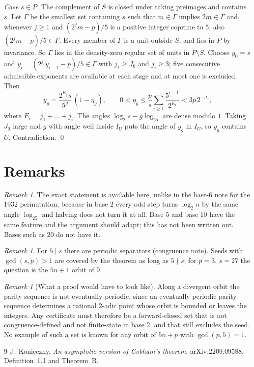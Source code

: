 \documentclass[11pt]{article}
\theoremstyle{remark}
\newtheorem{remark}[theorem]{Remark}
\begin{document}
\emph{Case $s\in P$.} The complement of $S$ is closed under taking preimages
and contains $s$. Let $\Gamma$ be the smallest set containing $s$ such that
$m\in\Gamma$ implies $2m\in\Gamma$ and, whenever $j\ge1$ and $(2^jm-p)/5$ is a
positive integer coprime to $5$, also $(2^jm-p)/5\in\Gamma$. Every member of
$\Gamma$ is a unit outside $S$, and lies in $P$ by invariance. So $\Gamma$ lies
in the density-zero regular set of units in $P\setminus S$. Choose
$y_0=s$ and $y_i=(2^{j_i}y_{i-1}-p)/5\in\Gamma$ with $j_1\ge J_0$ and
$j_i\ge3$; five consecutive admissible exponents are available at each stage
and at most one is excluded. Then
\[
y_g=\frac{2^{E_g}s}{5^{g}}\,(1-\eta_g),\qquad
0<\eta_g\le\frac ps\sum_{i\ge1}\frac{5^{i-1}}{2^{E_i}}<3p\,2^{-J_0},
\]
where $E_i=j_1+\dots+j_i$. The angles $\log_2s-g\log_25$ are dense modulo $1$.
Taking $J_0$ large and $g$ with angle well inside $I_U$ puts the angle of $y_g$
in $I_U$, so $y_g$ contains $U$. Contradiction. \qed

\section{Remarks}

\begin{remark}
The exact statement is available here, unlike in the base-$6$ note for the 1932
permutation, because in base $2$ every odd step turns $\log_2n$ by the same
angle $\log_25$ and halving does not turn it at all. Base $5$ and base $10$
have the same feature and the argument should adapt; this has not been written
out. Bases such as $20$ do not have it.
\end{remark}

\begin{remark}
For $5\mid s$ there are periodic separators (congruence note). Seeds with
$\gcd(s,p)>1$ are covered by the theorem as long as $5\nmid s$; for $p=3$,
$s=27$ the question is the $5n+1$ orbit of $9$.
\end{remark}

\begin{remark}[What a proof would have to look like]
Along a divergent orbit the parity sequence is not eventually periodic, since
an eventually periodic parity sequence determines a rational $2$-adic point
whose orbit is bounded or leaves the integers. Any certificate must therefore
be a forward-closed set that is not congruence-defined and not finite-state in
base $2$, and that still excludes the seed. No example of such a set is known
for any orbit of $5n+p$ with $\gcd(p,5)=1$.
\end{remark}

\begin{thebibliography}{9}
 J.~Konieczny, \emph{An asymptotic version of Cobham's theorem},
arXiv:2209.09588, Definition~1.1 and Theorem~B.
\end{thebibliography}
\end{document}
